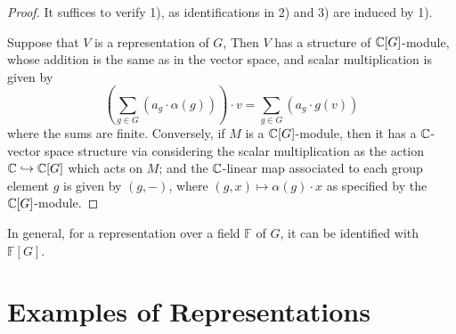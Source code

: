 \documentclass{article}
\begin{document}
\begin{proof}
    It suffices to verify 1), as identifications in 2) and 3) are induced by 1). 
    
    Suppose that $V$ is a representation of $G$, Then $V$ has a structure of $\mathbb{C}[G]$-module, whose addition is the same as in the vector space, and scalar multiplication is given by
    \[
        \left( \sum_{g \in G} (a_g \cdot \alpha(g)) \right) \cdot v = \sum_{g \in G} (a_g \cdot g(v))
    \]
    where the sums are finite. Conversely, if $M$ is a $\mathbb{C}[G]$-module, then it has a $\mathbb{C}$-vector space structure via considering the scalar multiplication as the action $\mathbb{C} \hookrightarrow \mathbb{C}[G]$ which acts on $M$; and the $\mathbb{C}$-linear map associated to each group element $g$ is given by $(g, -)$, where $(g, x) \mapsto \alpha(g) \cdot x$ as specified by the $\mathbb{C}[G]$-module. 
\end{proof}

\begin{remark}
    In general, for a representation over a field $\mathbb{F}$ of $G$, it can be identified with $\mathbb{F}[G]$.
\end{remark}

\section{Examples of Representations}
\end{document}
